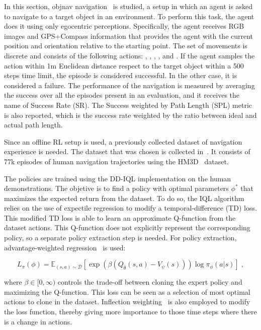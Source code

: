 In this section, \acrshort{objnav} navigation~\cite{batra2020} is studied, a setup in which an agent is asked to navigate to a target object in an environment.
To perform this task, the agent does it using only egocentric perceptions.
Specifically, the agent receives RGB images and GPS+Compass information that provides the agent with the current position and orientation relative to the starting point.
The set of movements is discrete and consists of the following actions: \turnleft, \turnright, \moveforward, \lookup, \lookdown and \stopac.
If the agent samples the \stopac action within 1m Euclidean distance respect to the target object within a 500 steps time limit, the episode is considered successful.
In the other case, it is considered a failure.
The performance of the navigation is measured by averaging the success over all the episodes present in an evaluation, and it receives the name of Success Rate (SR).
The Success weighted by Path Length (SPL) metric is also reported, which is the success rate weighted by the ratio between ideal and actual path length.

Since an offline RL setup is used, a previously collected dataset of navigation experience is needed.
The dataset that was chosen is collected in~\cite{ramrakhya2023}.
It consists of 77k episodes of human navigation trajectories using the HM3D~\cite{Ramakrishnan2021HabitatMatterport3D} dataset.

The policies are trained using the DD-IQL implementation on the human demonstrations.
The objetive is to find a policy with optimal parameters $\phi^*$ that maximizes the expected return from the dataset.
To do so, the IQL algorithm relies on the use of expectile regression to modify a temporal-difference (TD) loss.
This modified TD loss is able to learn an approximate Q-function from the dataset actions.
This Q-function does not explicitly represent the corresponding policy, so a separate policy extraction step is needed.
For policy extraction, advantage-weighted regression~\cite{peters2007, peng2019advantageweighted} is used:

\begin{equation}
    L_\pi(\phi)=\mathbb{E}_{(s, a) \sim \mathcal{D}}\left[\exp \left(\beta\left(Q_{\hat{\theta}}(s, a)-V_\psi(s)\right)\right) \log \pi_\phi(a|s)\right]\; ,
    \label{eq:loss}
\end{equation}

where $\beta \in [0, \infty)$ controls the trade-off between cloning the expert policy and maximizing the Q-function.
This loss can be seen as a selection of most optimal actions to clone in the dataset.
Inflection weighting~\cite{wijmans2019} is also employed to modify the loss function, thereby giving more importance to those time steps where there is a change in actions.

